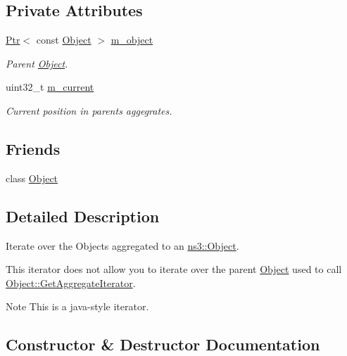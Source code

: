 \subsection*{Private Attributes}
\begin{DoxyCompactItemize}
\item 
\hyperlink{classns3_1_1Ptr}{Ptr}$<$ const \hyperlink{classns3_1_1Object}{Object} $>$ \hyperlink{classns3_1_1Object_1_1AggregateIterator_a5d28de5523e0b72ef19174bd76355ab1}{m\+\_\+object}
\begin{DoxyCompactList}\small\item\em Parent \hyperlink{classns3_1_1Object}{Object}. \end{DoxyCompactList}\item 
uint32\+\_\+t \hyperlink{classns3_1_1Object_1_1AggregateIterator_accdd67b89627711dda3947f878f124bd}{m\+\_\+current}
\begin{DoxyCompactList}\small\item\em Current position in parent\textquotesingle{}s aggegrates. \end{DoxyCompactList}\end{DoxyCompactItemize}
\subsection*{Friends}
\begin{DoxyCompactItemize}
\item 
class \hyperlink{classns3_1_1Object_1_1AggregateIterator_a0720b5f434e636e22a3ed34f847eec57}{Object}
\end{DoxyCompactItemize}


\subsection{Detailed Description}
Iterate over the Objects aggregated to an \hyperlink{classns3_1_1Object}{ns3\+::\+Object}. 

This iterator does not allow you to iterate over the parent \hyperlink{classns3_1_1Object}{Object} used to call \hyperlink{classns3_1_1Object_acdd85719e950c54a9a3ccf24f3816d5b}{Object\+::\+Get\+Aggregate\+Iterator}.

\begin{DoxyNote}{Note}
This is a java-\/style iterator. 
\end{DoxyNote}


\subsection{Constructor \& Destructor Documentation}
